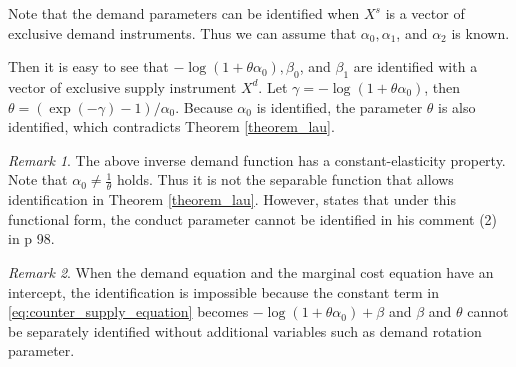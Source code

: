 \documentclass[11pt, a4paper]{article}
\theoremstyle{remark}
\newtheorem{remark}{Remark}
\begin{document}
Note that the demand parameters can be identified when $X^s$ is a vector of exclusive demand instruments.
Thus we can assume that $\alpha_0, \alpha_1$, and $\alpha_2$ is known.  

Then it is easy to see that $- \log(1 + \theta\alpha_0), \beta_0$, and $\beta_1$ are identified with a vector of exclusive supply instrument $X^d$.
Let $\gamma = - \log(1 + \theta\alpha_0)$, then $\theta = (\exp(-\gamma) - 1)/\alpha_0$.
Because $\alpha_0$ is identified, the parameter $\theta$ is also identified, which contradicts Theorem \ref{theorem_lau}.

\begin{remark}
    The above inverse demand function has a constant-elasticity property. 
    Note that $\alpha_0 \ne \frac{1}{\theta}$ holds.
    Thus it is not the separable function that allows identification in Theorem \ref{theorem_lau}.
    However, \citet{lau1982identifying} states that under this functional form, the conduct parameter cannot be identified in his comment (2) in p 98.
\end{remark}

\begin{remark}
    When the demand equation and the marginal cost equation have an intercept, the identification is impossible because the constant term in \eqref{eq:counter_supply_equation} becomes $-\log(1+\theta \alpha_0) + \beta$ and $\beta$ and $\theta$ cannot be separately identified without additional variables such as demand rotation parameter.
\end{remark}



\newpage


\end{document}
